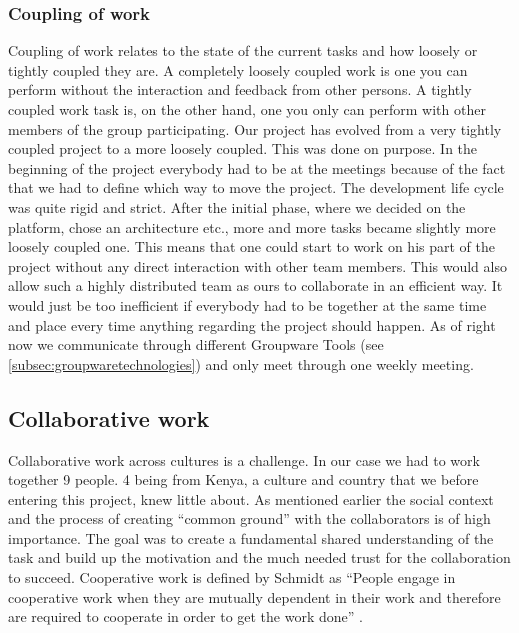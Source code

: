 \subsubsection{Coupling of work} \label{subsubsec:couplingofwork}
Coupling of work relates to the state of the current tasks and how loosely or tightly coupled they are. A completely loosely coupled work is one you can perform without the interaction and feedback from other persons. A tightly coupled work task is, on the other hand, one you only can perform with other members of the group participating. Our project has evolved from a very tightly coupled project to a more loosely coupled. This was done on purpose. In the beginning of the project everybody had to be at the meetings because of the fact that we had to define which way to move the project. The development life cycle was quite rigid and strict. After the initial phase, where we decided on the platform, chose an architecture etc., more and more tasks became slightly more loosely coupled one. This means that one could start to work on his part of the project without any direct interaction with other team members. This would also allow such a highly distributed team as ours to collaborate in an efficient way. It would just be too inefficient if everybody had to be together at the same time and place every time anything regarding the project should happen. As of right now we communicate through different Groupware Tools (see \ref{subsec:groupwaretechnologies}) and only meet through one weekly meeting.

\subsection{Collaborative work} \label{sub:collaborativework}
Collaborative work across cultures is a challenge. In our case we had to work together 9 people. 4 being from Kenya, a culture and country that we before entering this project, knew little about. As mentioned earlier the social context and the process of creating ``common ground'' with the collaborators is of high importance. The goal was to create a fundamental shared understanding of the task and build up the motivation and the much needed trust for the collaboration to succeed. Cooperative work is defined by Schmidt as ``People engage in cooperative work when they are mutually dependent in their work and therefore are required to cooperate in order to get the work done'' \cite{schmidt1992taking}.

